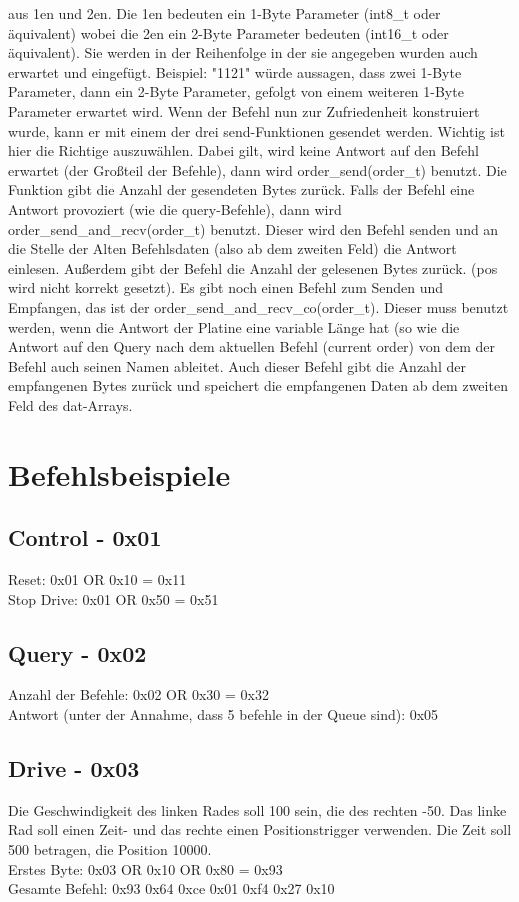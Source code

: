 \documentclass[a4paper]{article}
\begin{document}
	aus 1en und 2en. Die 1en bedeuten ein 1-Byte Parameter (int8\_t oder äquivalent) wobei die 2en ein 2-Byte
	Parameter bedeuten (int16\_t oder äquivalent). Sie werden in der Reihenfolge in der sie angegeben wurden auch erwartet
	und eingefügt. Beispiel: "1121" würde aussagen, dass zwei 1-Byte Parameter, dann ein 2-Byte Parameter, gefolgt von
	einem weiteren 1-Byte Parameter erwartet wird.
	Wenn der Befehl nun zur Zufriedenheit konstruiert wurde, kann er mit einem der drei send-Funktionen gesendet werden.
	Wichtig ist hier die Richtige auszuwählen. Dabei gilt, wird keine Antwort auf den Befehl erwartet (der Großteil der
	Befehle), dann wird order\_send(order\_t) benutzt. Die Funktion gibt die Anzahl der gesendeten Bytes zurück.
	Falls der Befehl eine Antwort provoziert (wie die query-Befehle), dann wird order\_send\_and\_recv(order\_t) benutzt.
	Dieser wird den Befehl senden und an die Stelle der Alten Befehlsdaten (also ab dem zweiten Feld) die Antwort einlesen.
	Außerdem gibt der Befehl die Anzahl der gelesenen Bytes zurück. (pos wird nicht korrekt gesetzt).
	Es gibt noch einen Befehl zum Senden und Empfangen, das ist der order\_send\_and\_recv\_co(order\_t). Dieser muss
	benutzt werden, wenn die Antwort der Platine eine variable Länge hat (so wie die Antwort auf den Query nach dem
	aktuellen Befehl (current order) von dem der Befehl auch seinen Namen ableitet. Auch dieser Befehl gibt die Anzahl
	der empfangenen Bytes zurück und speichert die empfangenen Daten ab dem zweiten Feld des dat-Arrays.

	\section{Befehlsbeispiele}

	\subsection{Control - 0x01}
	
	Reset: 0x01 OR 0x10 = 0x11\\
	Stop Drive: 0x01 OR 0x50 = 0x51

	\subsection{Query - 0x02}
	Anzahl der Befehle: 0x02 OR 0x30 = 0x32\\
	Antwort (unter der Annahme, dass 5 befehle in der Queue sind): 0x05

	\subsection{Drive - 0x03}
	Die Geschwindigkeit des linken Rades soll 100 sein, die des rechten -50. Das linke Rad soll einen Zeit- und das
	rechte einen Positionstrigger verwenden. Die Zeit soll 500 betragen, die Position 10000.\\
	Erstes Byte: 0x03 OR 0x10 OR 0x80 = 0x93\\
	Gesamte Befehl: 0x93 0x64 0xce 0x01 0xf4 0x27 0x10
\end{document}
